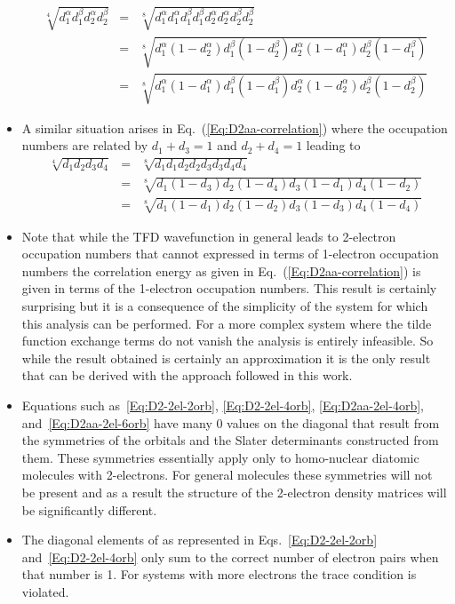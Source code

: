 \documentclass[aip,graphicx]{revtex4-1}
\begin{document}
\begin{itemize}
\begin{eqnarray}
\sqrt[4]{d_1^\alpha d_1^\beta d_2^\alpha d_2^\beta}
&=& \sqrt[8]{d_1^\alpha d_1^\alpha d_1^\beta d_1^\beta d_2^\alpha d_2^\alpha d_2^\beta d_2^\beta} \\
&=& \sqrt[8]{d_1^\alpha (1-d_2^\alpha) d_1^\beta (1-d_2^\beta) d_2^\alpha (1-d_1^\alpha) d_2^\beta (1-d_1^\beta)} \\
&=& \sqrt[8]{d_1^\alpha (1-d_1^\alpha) d_1^\beta (1-d_1^\beta) d_2^\alpha (1-d_2^\alpha) d_2^\beta (1-d_2^\beta)}
\end{eqnarray}
\item A similar situation arises in Eq.~(\ref{Eq:D2aa-correlation}) where the occupation numbers are related by $d_1+d_3 = 1$ and $d_2+d_4 = 1$ leading to
\begin{eqnarray}
\sqrt[4]{d_1 d_2 d_3 d_4}
&=& \sqrt[8]{d_1 d_1 d_2 d_2 d_3 d_3 d_4 d_4} \\
&=& \sqrt[8]{d_1 (1-d_3) d_2 (1-d_4) d_3 (1-d_1) d_4 (1-d_2)} \\
&=& \sqrt[8]{d_1 (1-d_1) d_2 (1-d_2) d_3 (1-d_3) d_4 (1-d_4)}
\end{eqnarray}
\item Note that while the TFD wavefunction in general leads to 2-electron occupation numbers that cannot expressed in terms of 1-electron occupation numbers the correlation energy as given in Eq.~(\ref{Eq:D2aa-correlation}) is given in terms of the 1-electron occupation numbers. This result is certainly surprising but it is a consequence of the simplicity of the system for which this analysis can be performed. For a more complex system where the tilde function exchange terms do not vanish the analysis is entirely infeasible. So while the result obtained is certainly an approximation it is the only result that can be derived with the approach followed in this work.
\item Equations such as~\ref{Eq:D2-2el-2orb}, \ref{Eq:D2-2el-4orb}, \ref{Eq:D2aa-2el-4orb}, and~\ref{Eq:D2aa-2el-6orb} have many 0 values on the diagonal that result from the symmetries of the orbitals and the Slater determinants constructed from them. These symmetries essentially apply only to homo-nuclear diatomic molecules with 2-electrons. For general molecules these symmetries will not be present and as a result the structure of the 2-electron density matrices will be significantly different.
\item The diagonal elements of as represented in Eqs.~\ref{Eq:D2-2el-2orb} and~\ref{Eq:D2-2el-4orb} only sum to the correct number of electron pairs when that number is 1. For systems with more electrons the trace condition is violated.
\end{itemize}
\end{document}
